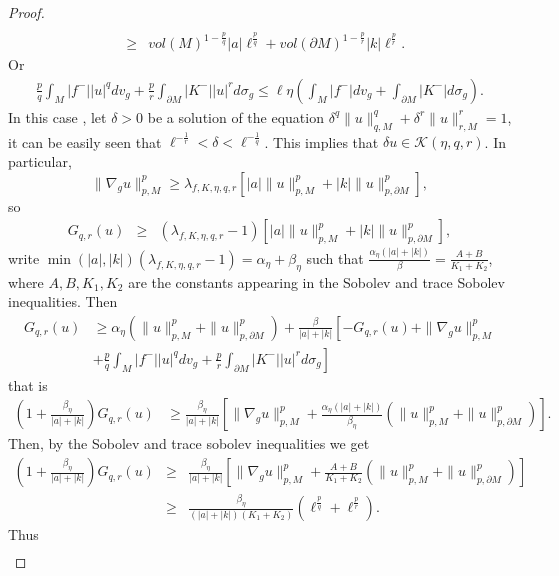 \documentclass{Tran-l}
\theoremstyle{definition}
\theoremstyle{remark}
\numberwithin{equation}{section}
\begin{document}
\begin{proof}
\begin{eqnarray*}
\\&\geq&vol(M)^{1-\frac{p}{q}}|a|\ell^{\frac{p}{q}}+
vol(\partial M)^{1-\frac{p}{r}}|k|\ell^{\frac{p}{r}}.
\end{eqnarray*}
Or
\begin{eqnarray*} \frac{p}{q}\int_M|f^-||u|^qdv_g+\frac{p}{r}\int_{\partial
M}|K^-||u|^rd\sigma_g\leq\ell\eta(\int_M|f^-|dv_g +\int_{\partial
M}|K^-|d\sigma_g).
\end{eqnarray*}
In this case , let $\delta>0$ be a solution of the equation
$\delta^q \|u\|_{q,M}^q+\delta^r\| u\|_{r,M}^r=1$, it can be easily
seen that $\ell^{-\frac{1}{r}}<\delta<\ell^{-\frac{1}{q}}$. This
implies that $\delta u\in{\mathcal{K}}(\eta,q,r)$. In particular,
\begin{equation*}
\|\nabla_gu\|^p_{p,M}\geq\lambda_{f,K,\eta,q,r}\left[|a|\|u\|^p_{p,M}
+|k|\|u\|^p_{p,\partial
    M}\right],
\end{equation*}
so
\begin{eqnarray*}
G_{q,r}(u) &\geq& (\lambda_{f,K,\eta,q,r}-1)\left[|a|\|u\|^p_{p,M}
+|k|\|u\|^p_{p,\partial
    M}\right],
\end{eqnarray*}
write
$\min(|a|,|k|)(\lambda_{f,K,\eta,q,r}-1)=\alpha_\eta+\beta_\eta$
such that $\frac{\alpha_\eta(|a|+|k|)}{\beta}=\frac{A+B}{K_1+K_2}$,
where $A,B,K_1,K_2$ are the constants appearing in the Sobolev and
trace Sobolev inequalities. Then
\begin{eqnarray*}
G_{q,r}(u) &\geq\alpha_\eta(\|u\|^p_{p,M}+\|u\|^p_{p,\partial
M})+\frac{\beta}{|a|+|k|}\left[-
G_{q,r}(u)+\|\nabla_gu\|_{p,M}^p\right.\\&
\left.+\frac{p}{q}\int_M|f^-||u|^qdv_g +\frac{p}{r}\int_{\partial
M}|K^-||u|^rd\sigma_g\right]
\end{eqnarray*}
that is
\begin{eqnarray*}
\left(1+\frac{\beta_\eta}{|a|+|k|}\right)G_{q,r}(u)
&\geq\frac{\beta_\eta}{|a|+|k|}\left[
\|\nabla_gu\|_{p,M}^p+\frac{\alpha_\eta(|a|+|k|)}{\beta_\eta}(\|u\|^p_{p,M}+
\|u\|^p_{p,\partial M})\right].
\end{eqnarray*}
Then, by the Sobolev and trace sobolev inequalities we get
\begin{eqnarray*}
\left(1+\frac{\beta_\eta}{|a|+|k|}\right)G_{q,r}(u)
&\geq&\frac{\beta_\eta}{|a|+|k|}\left[
\|\nabla_gu\|_{p,M}^p+\frac{A+B}{K_1+K_2}(\|u\|^p_{p,M}+\|u\|^p_{p,\partial
M})\right]\\&\geq&\frac{\beta_\eta}{(|a|+|k|)(K_1+K_2)}(\ell^{\frac{p}{q}}+\ell^{\frac{p}{r}}).
\end{eqnarray*}
Thus
\begin{eqnarray*}

\end{eqnarray*}
\end{proof}
\end{document}
